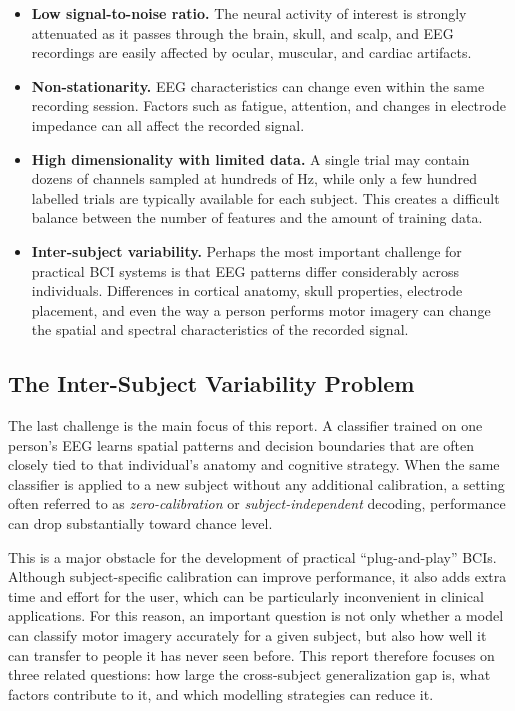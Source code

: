 \documentclass[11pt,a4paper]{article}
\begin{document}
	\begin{itemize}[leftmargin=1.2cm]
		\item \textbf{Low signal-to-noise ratio.} The neural activity of interest is strongly
		attenuated as it passes through the brain, skull, and scalp, and EEG recordings are
		easily affected by ocular, muscular, and cardiac artifacts.
		
		\item \textbf{Non-stationarity.} EEG characteristics can change even within the same
		recording session. Factors such as fatigue, attention, and changes in electrode impedance
		can all affect the recorded signal.
		
		\item \textbf{High dimensionality with limited data.} A single trial may contain dozens
		of channels sampled at hundreds of Hz, while only a few hundred labelled trials are
		typically available for each subject. This creates a difficult balance between the
		number of features and the amount of training data.
		
		\item \textbf{Inter-subject variability.} Perhaps the most important challenge for
		practical BCI systems is that EEG patterns differ considerably across individuals.
		Differences in cortical anatomy, skull properties, electrode placement, and even the
		way a person performs motor imagery can change the spatial and spectral characteristics
		of the recorded signal.
	\end{itemize}
	
	\subsection{The Inter-Subject Variability Problem}
	
	The last challenge is the main focus of this report. A classifier trained on one person's
	EEG learns spatial patterns and decision boundaries that are often closely tied to that
	individual's anatomy and cognitive strategy. When the same classifier is applied to a new
	subject without any additional calibration, a setting often referred to as
	\emph{zero-calibration} or \emph{subject-independent} decoding, performance can drop
	substantially toward chance level.
	
	This is a major obstacle for the development of practical ``plug-and-play'' BCIs.
	Although subject-specific calibration can improve performance, it also adds extra time and
	effort for the user, which can be particularly inconvenient in clinical applications.
	For this reason, an important question is not only whether a model can classify motor
	imagery accurately for a given subject, but also how well it can transfer to people it has
	never seen before. This report therefore focuses on three related questions: how large the
	cross-subject generalization gap is, what factors contribute to it, and which modelling
	strategies can reduce it.
	
\end{document}
